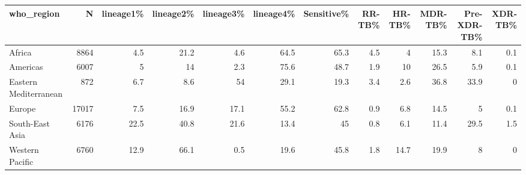 \begin{tabular}{lrrrrrrrrrrr}
\hline
 who\_region            &     N &   lineage1\% &   lineage2\% &   lineage3\% &   lineage4\% &   Sensitive\% &   RR-TB\% &   HR-TB\% &   MDR-TB\% &   Pre-XDR-TB\% &   XDR-TB\% \\
\hline
 Africa                &  8864 &         4.5 &        21.2 &         4.6 &        64.5 &         65.3 &      4.5 &      4   &      15.3 &           8.1 &       0.1 \\
 Americas              &  6007 &         5   &        14   &         2.3 &        75.6 &         48.7 &      1.9 &     10   &      26.5 &           5.9 &       0.1 \\
 Eastern Mediterranean &   872 &         6.7 &         8.6 &        54   &        29.1 &         19.3 &      3.4 &      2.6 &      36.8 &          33.9 &       0   \\
 Europe                & 17017 &         7.5 &        16.9 &        17.1 &        55.2 &         62.8 &      0.9 &      6.8 &      14.5 &           5   &       0.1 \\
 South-East Asia       &  6176 &        22.5 &        40.8 &        21.6 &        13.4 &         45   &      0.8 &      6.1 &      11.4 &          29.5 &       1.5 \\
 Western Pacific       &  6760 &        12.9 &        66.1 &         0.5 &        19.6 &         45.8 &      1.8 &     14.7 &      19.9 &           8   &       0   \\
\hline
\end{tabular}